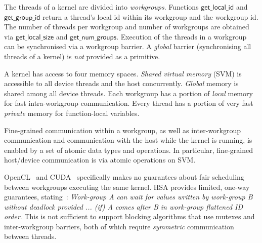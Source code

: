 \documentclass[sigconf]{acmart}
\newcommand{\getgroupid}{\mathsf{get\_group\_id}}
\newcommand{\getnumgroups}{\mathsf{get\_num\_groups}}
\newcommand{\getlocalid}{\mathsf{get\_local\_id}}
\newcommand{\getglobalid}{\mathsf{get\_global\_id}}
\newcommand{\getlocalsize}{\mathsf{get\_local\_size}}
\newcommand{\getglobalsize}{\mathsf{get\_global\_size}}
\begin{document}
The threads of a kernel are divided into \emph{workgroups}.
Functions
$\getlocalid$ and $\getgroupid$ return a thread's local id within
its workgroup and the workgroup id.
%
%
The number
of threads per workgroup and number of workgroups are obtained via
$\getlocalsize$ and $\getnumgroups$.
%
Execution of the threads in a workgroup can be synchronised via a
workgroup barrier. 
A \emph{global} barrier (synchronising all
threads of a kernel) is \emph{not} provided as a primitive.

 A kernel has access to
four memory spaces.  \emph{Shared virtual memory} (SVM) is accessible
to all device threads and the host concurrently.  \emph{Global} memory is
shared among all device threads.  Each workgroup has a
portion of \emph{local} memory for fast intra-workgroup communication.
Every thread has a portion of very fast \emph{private} memory for
function-local variables.

Fine-grained
communication within a workgroup, as well as inter-workgroup
communication and communication with the host while the kernel is
running, is enabled by a set of atomic data types and operations.  In
particular, fine-grained host/device communication is via atomic
operations on SVM.

OpenCL~\cite[p.\ 31]{opencl2Spec} and CUDA~\cite{cuda-75} specifically makes no guarantees about fair scheduling between
workgroups executing the same kernel. 
%
HSA provides limited, one-way guarantees,
stating~\cite[p. 46]{HSAprogramming11}: \emph{Work-group A can wait
  for values written by work-group B without deadlock provided ... (if) A
  comes after B in work-group flattened ID order}. This is not sufficient to support blocking algorithms that use
mutexes and inter-workgroup barriers, both of which require \emph{symmetric} communication between
threads.
\end{document}
